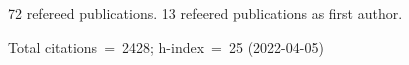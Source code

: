 72 refereed publications. 13 refeered publications as first author.

Total citations~=~2428; h-index~=~25 (2022-04-05)